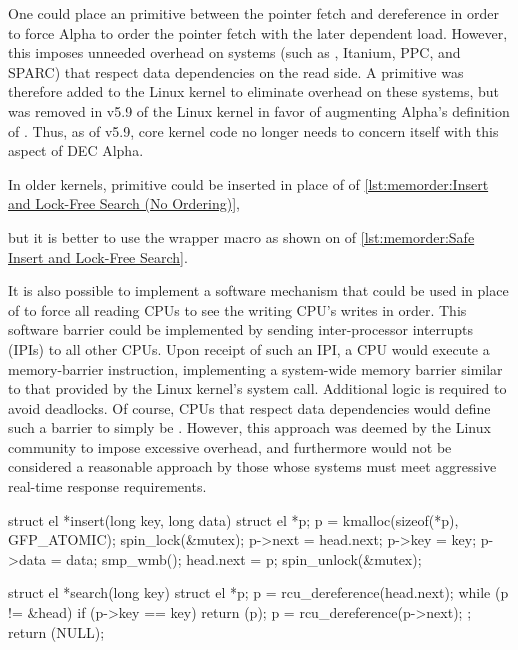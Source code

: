One could place an  primitive
between the pointer fetch and dereference in order to force Alpha
to order the pointer fetch with the later dependent load.
However, this imposes unneeded overhead on systems (such as \ARM,
Itanium, PPC, and SPARC) that respect data dependencies on the read side.
A  primitive was therefore added to the
Linux kernel to eliminate overhead on these systems, but was removed
in v5.9 of the Linux kernel in favor of augmenting Alpha's definition
of .
Thus, as of v5.9, core kernel code no longer needs to concern itself
with this aspect of DEC Alpha.
\begin{fcvref}
In older kernels,  primitive could be
inserted in place of  of
\cref{lst:memorder:Insert and Lock-Free Search (No Ordering)},
\end{fcvref}
\begin{fcvref}
but it is better to use the  wrapper macro
as shown on  of
\cref{lst:memorder:Safe Insert and Lock-Free Search}.
\end{fcvref}

It is also possible to implement a software mechanism
that could be used in place of  to force
all reading CPUs to see the writing CPU's writes in order.
This software barrier could be implemented by sending inter-processor
interrupts (IPIs) to all other CPUs.
Upon receipt of such an IPI, a CPU would execute a memory-barrier
instruction, implementing a system-wide memory barrier similar to that
provided by the Linux kernel's  system call.
Additional logic is required to avoid deadlocks.
Of course, CPUs that respect data dependencies would define such a barrier
to simply be .
However, this approach was deemed by the Linux community
to impose excessive overhead\cite{McKenney01f}, and furthermore would
not be considered a reasonable approach by those whose systems must meet
aggressive real-time response requirements.

\begin{listing}[tbp]
\begin{fcvlabel}
\begin{VerbatimL}[commandchars=\\\[\]]
struct el *insert(long key, long data)
{
	struct el *p;
	p = kmalloc(sizeof(*p), GFP_ATOMIC);
	spin_lock(&mutex);
	p->next = head.next;
	p->key = key;
	p->data = data;
	smp_wmb();
	head.next = p;
	spin_unlock(&mutex);
}

struct el *search(long key)
{
	struct el *p;
	p = rcu_dereference(head.next);		\lnlbl[deref1]
	while (p != &head) {
		if (p->key == key) {
			return (p);
		}
		p = rcu_dereference(p->next);	\lnlbl[deref2]
	};
	return (NULL);
}
\end{VerbatimL}
\end{fcvlabel}
\caption{Safe Insert and Lock-Free Search}
\label{lst:memorder:Safe Insert and Lock-Free Search}
\end{listing}

